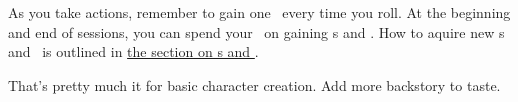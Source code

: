 \par
As you take actions, remember to gain one \xp\, every time you roll. At the beginning and end of sessions, you can spend your \xp\, on gaining \skill s and \abilityP . How to aquire new \skill s and \abilityP\, is outlined in \hyperlink{skills}{the section on \skill s and \abilityP} .

\par
That's pretty much it for basic character creation. Add more backstory to taste.